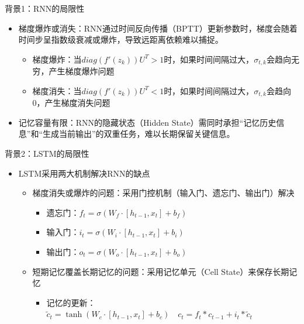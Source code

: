 \begin{frame}{背景1：RNN的局限性}
    \begin{itemize}
        \item 梯度爆炸或消失：RNN通过时间反向传播（BPTT）更新参数时，梯度会随着时间步呈指数级衰减或爆炸，导致远距离依赖难以捕捉。
        \begin{itemize}
            \item 梯度爆炸：当\(diag(f'(z_k))U^T > 1\)时，如果时间间隔过大，\(\sigma_{t,k}\)会趋向无穷，产生梯度爆炸问题
            \item 梯度消失：当\(diag(f'(z_k))U^T < 1\)时，如果时间间隔过大，\(\sigma_{t,k}\)会趋向0，产生梯度消失问题
        \end{itemize}
        \item 记忆容量有限：RNN的隐藏状态（Hidden State）需同时承担“记忆历史信息”和“生成当前输出”的双重任务，难以长期保留关键信息。
    \end{itemize}
\end{frame}

\begin{frame}{背景2：LSTM的局限性}
    \begin{itemize}
        \item LSTM采用两大机制解决RNN的缺点
        \begin{itemize}
            \item 梯度消失或爆炸的问题：采用门控机制（输入门、遗忘门、输出门）解决
            \begin{itemize}
                \item 遗忘门：\(f_t = \sigma(W_f \cdot [h_{t-1}, x_t] + b_f)\)
                \item 输入门：\(i_t = \sigma(W_i \cdot [h_{t-1}, x_t] + b_i)\)
                \item 输出门：\(o_t = \sigma(W_o \cdot [h_{t-1}, x_t] + b_o)\)
            \end{itemize}
            \item 短期记忆覆盖长期记忆的问题：采用记忆单元（Cell State）来保存长期记忆
            \begin{itemize}
                \item 记忆的更新：\(\tilde{c}_t = \tanh(W_c \cdot [h_{t-1}, x_t] + b_c) \quad  c_t = f_t * c_{t-1} + i_t * \tilde{c}_t\)
            \end{itemize}
        \end{itemize}
    \end{itemize}
\end{frame}

